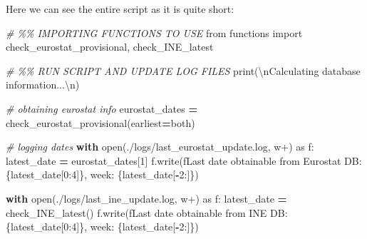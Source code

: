 \documentclass[
  a4paper]{article}
\newenvironment{Shaded}{\begin{snugshade}}{\end{snugshade}}
\newcommand{\BuiltInTok}[1]{#1}
\newcommand{\CharTok}[1]{\textcolor[rgb]{0.31,0.60,0.02}{#1}}
\newcommand{\CommentTok}[1]{\textcolor[rgb]{0.56,0.35,0.01}{\textit{#1}}}
\newcommand{\ControlFlowTok}[1]{\textcolor[rgb]{0.13,0.29,0.53}{\textbf{#1}}}
\newcommand{\DecValTok}[1]{\textcolor[rgb]{0.00,0.00,0.81}{#1}}
\newcommand{\ImportTok}[1]{#1}
\newcommand{\NormalTok}[1]{#1}
\newcommand{\OperatorTok}[1]{\textcolor[rgb]{0.81,0.36,0.00}{\textbf{#1}}}
\newcommand{\SpecialCharTok}[1]{\textcolor[rgb]{0.00,0.00,0.00}{#1}}
\newcommand{\SpecialStringTok}[1]{\textcolor[rgb]{0.31,0.60,0.02}{#1}}
\newcommand{\StringTok}[1]{\textcolor[rgb]{0.31,0.60,0.02}{#1}}
\begin{document}
Here we can see the entire script as it is quite short:

\footnotesize

\begin{Shaded}
\begin{Highlighting}[]
\CommentTok{\# \%\% IMPORTING FUNCTIONS TO USE}
\ImportTok{from}\NormalTok{ functions }\ImportTok{import}\NormalTok{ check\_eurostat\_provisional, check\_INE\_latest}

\CommentTok{\# \%\% RUN SCRIPT AND UPDATE LOG FILES}
\BuiltInTok{print}\NormalTok{(}\StringTok{\textquotesingle{}}\CharTok{\textbackslash{}n}\StringTok{Calculating database information...}\CharTok{\textbackslash{}n}\StringTok{\textquotesingle{}}\NormalTok{)}

\CommentTok{\# obtaining eurostat info}
\NormalTok{eurostat\_dates }\OperatorTok{=}\NormalTok{ check\_eurostat\_provisional(earliest}\OperatorTok{=}\StringTok{\textquotesingle{}both\textquotesingle{}}\NormalTok{)}

\CommentTok{\# logging dates}
\ControlFlowTok{with} \BuiltInTok{open}\NormalTok{(}\StringTok{\textquotesingle{}./logs/last\_eurostat\_update.log\textquotesingle{}}\NormalTok{, }\StringTok{\textquotesingle{}w+\textquotesingle{}}\NormalTok{) }\ImportTok{as}\NormalTok{ f:}
\NormalTok{    latest\_date }\OperatorTok{=}\NormalTok{ eurostat\_dates[}\DecValTok{1}\NormalTok{]}
\NormalTok{    f.write(}\SpecialStringTok{f\textquotesingle{}Last date obtainable from Eurostat DB: }\SpecialCharTok{\{}\NormalTok{latest\_date[}\DecValTok{0}\NormalTok{:}\DecValTok{4}\NormalTok{]}\SpecialCharTok{\}}\SpecialStringTok{, week: }\SpecialCharTok{\{}\NormalTok{latest\_date[}\OperatorTok{{-}}\DecValTok{2}\NormalTok{:]}\SpecialCharTok{\}}\SpecialStringTok{\textquotesingle{}}\NormalTok{)}

\ControlFlowTok{with} \BuiltInTok{open}\NormalTok{(}\StringTok{\textquotesingle{}./logs/last\_ine\_update.log\textquotesingle{}}\NormalTok{, }\StringTok{\textquotesingle{}w+\textquotesingle{}}\NormalTok{) }\ImportTok{as}\NormalTok{ f:}
\NormalTok{    latest\_date }\OperatorTok{=}\NormalTok{ check\_INE\_latest()}
\NormalTok{    f.write(}\SpecialStringTok{f\textquotesingle{}Last date obtainable from INE DB: }\SpecialCharTok{\{}\NormalTok{latest\_date[}\DecValTok{0}\NormalTok{:}\DecValTok{4}\NormalTok{]}\SpecialCharTok{\}}\SpecialStringTok{, week: }\SpecialCharTok{\{}\NormalTok{latest\_date[}\OperatorTok{{-}}\DecValTok{2}\NormalTok{:]}\SpecialCharTok{\}}\SpecialStringTok{\textquotesingle{}}\NormalTok{)}


\end{Highlighting}
\end{Shaded}
\end{document}
